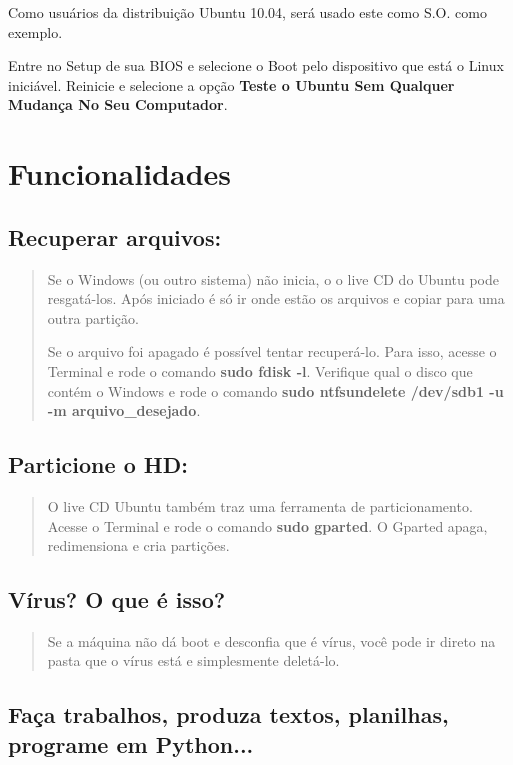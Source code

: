 \documentclass[12pt, a4paper, tocpage=plain]{abnt} %
\begin{document}
Como usuários da distribuição Ubuntu 10.04, será usado este como S.O. como exemplo.

Entre no Setup de sua BIOS e selecione o Boot pelo dispositivo que está o Linux iniciável. Reinicie e selecione a opção {\bf Teste o Ubuntu Sem Qualquer Mudança No Seu Computador}.

\chapter{Funcionalidades}


\section{Recuperar arquivos:}

\begin{quote}
Se o Windows (ou outro sistema) não inicia, o o live CD do Ubuntu pode resgatá-los. Após iniciado é só ir onde estão os arquivos e copiar para uma outra partição. 

Se o arquivo foi apagado é possível tentar recuperá-lo. Para isso, acesse o Terminal e rode o comando  {\bf sudo fdisk -l}. Verifique qual o disco que contém o Windows e rode o comando {\bf sudo ntfsundelete /dev/sdb1 -u -m arquivo\_desejado}.
\end{quote}

\section{Particione o HD:}

\begin{quote}
O live CD Ubuntu também traz uma ferramenta de particionamento. Acesse o Terminal e rode o comando {\bf sudo gparted}. O Gparted apaga, redimensiona e cria partições.
\end{quote}

\section{Vírus? O que é isso?}

\begin{quote}
Se a máquina não dá boot e desconfia que é vírus, você pode ir direto na pasta que o vírus está e simplesmente deletá-lo.
\end{quote}

\section{Faça trabalhos, produza textos, planilhas, programe em Python...}
\end{document}
